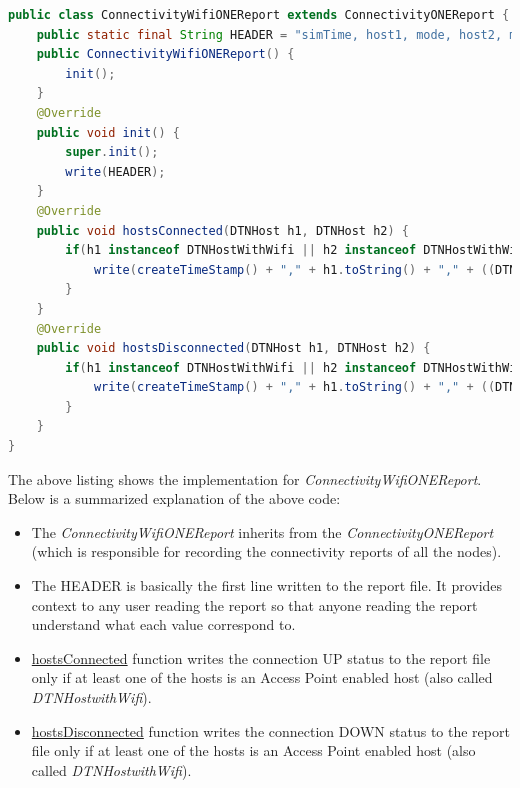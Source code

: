 \begin{lstlisting}[language=java]
public class ConnectivityWifiONEReport extends ConnectivityONEReport {
	public static final String HEADER = "simTime, host1, mode, host2, mode, up/down";
	public ConnectivityWifiONEReport() {
		init();
	}
	@Override
	public void init() {
		super.init();
		write(HEADER);
	}
	@Override
	public void hostsConnected(DTNHost h1, DTNHost h2) {
		if(h1 instanceof DTNHostWithWifi || h2 instanceof DTNHostWithWifi) {
			write(createTimeStamp() + "," + h1.toString() + "," + ((DTNHostWithWifi)h1).getModeName() + "," + h2.toString() + "," + ((DTNHostWithWifi)h2).getModeName() + "," + "UP");
		}
	}
	@Override
	public void hostsDisconnected(DTNHost h1, DTNHost h2) {
		if(h1 instanceof DTNHostWithWifi || h2 instanceof DTNHostWithWifi) {
			write(createTimeStamp() + "," + h1.toString() + "," + ((DTNHostWithWifi)h1).getModeName() + "," + h2.toString() + "," + ((DTNHostWithWifi)h2).getModeName() + "," + "DOWN");
		}
	}
}
\end{lstlisting}
\vspace{5mm}
The above listing shows the implementation for \textit{ConnectivityWifiONEReport}. Below is a summarized explanation of the above code:
\begin{itemize}
	\item The \textit{ConnectivityWifiONEReport} inherits from the \textit{ConnectivityONEReport} (which is responsible for recording the connectivity reports of all the nodes).
	\item The HEADER is basically the first line written to the report file. It provides context to any user reading the report so that anyone reading the report understand what each value correspond to.
	\item \underline{hostsConnected} function writes the connection UP status to the report file only if at least one of the hosts is an Access Point enabled host (also called \textit{DTNHostwithWifi}).
	\item \underline{hostsDisconnected} function writes the connection DOWN status to the report file only if at least one of the hosts is an Access Point enabled host (also called \textit{DTNHostwithWifi}).
\end{itemize}

